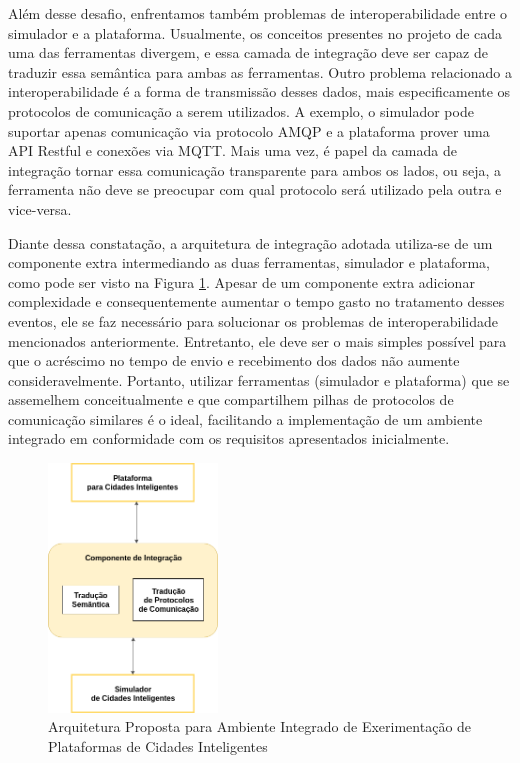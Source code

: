 Além desse desafio, enfrentamos também problemas de interoperabilidade entre o simulador e a plataforma.
Usualmente, os conceitos presentes no projeto de cada uma das ferramentas divergem, e essa camada de integração deve ser capaz de traduzir essa semântica para ambas as ferramentas.
Outro problema relacionado a interoperabilidade é a forma de transmissão desses dados, mais especificamente os protocolos de comunicação a serem utilizados.
A exemplo, o simulador pode suportar apenas comunicação via protocolo AMQP e a plataforma prover uma API Restful e conexões via MQTT.
Mais uma vez, é papel da camada de integração tornar essa comunicação transparente para ambos os lados, ou seja, a ferramenta não deve se preocupar com qual protocolo será utilizado pela outra e vice-versa.

Diante dessa constatação, a arquitetura de integração adotada utiliza-se de um componente extra intermediando as duas ferramentas, simulador e plataforma, como pode ser visto na
Figura \ref{fig:general_architecture}.
Apesar de um componente extra adicionar complexidade e consequentemente aumentar o tempo gasto no tratamento desses eventos, ele se faz necessário para solucionar os problemas
de interoperabilidade mencionados anteriormente.
Entretanto, ele deve ser o mais simples possível para que o acréscimo no tempo de envio e recebimento dos dados não aumente consideravelmente.
Portanto, utilizar ferramentas (simulador e plataforma) que se assemelhem conceitualmente e que compartilhem pilhas de protocolos de comunicação similares é o ideal,
facilitando a implementação de um ambiente integrado em conformidade com os requisitos apresentados inicialmente.

\begin{figure}[ht]
	\centering
	\includegraphics[width=0.4\textwidth]{figuras/integration-general-architecture.png}
	\caption{Arquitetura Proposta para Ambiente Integrado de Exerimentação de Plataformas de Cidades Inteligentes}
	\label{fig:general_architecture}
\end{figure}


